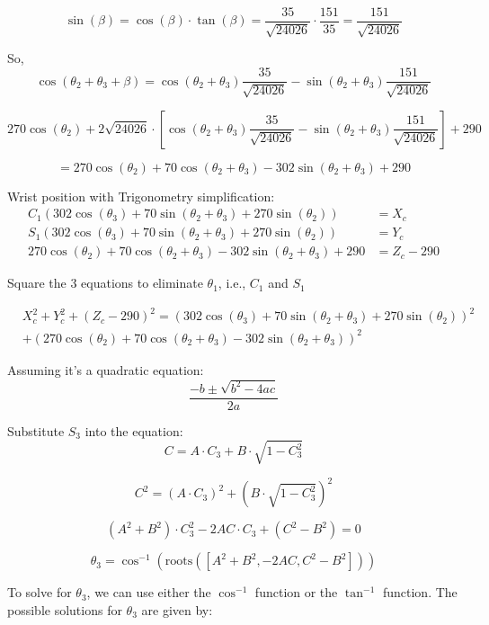 \[
  \sin (\beta) = \cos (\beta) \cdot \tan (\beta) = \frac{35}{\sqrt{24026}} \cdot \frac{151}{35} = \frac{151}{\sqrt{24026}}
\]

So,
\[
  \cos (\theta_2 + \theta_3 + \beta) = \cos (\theta_2 + \theta_3) \frac{35}{\sqrt{24026}} - \sin (\theta_2 + \theta_3) \frac{151}{\sqrt{24026}}
\]

\[
  270 \cos (\theta_2) + 2 \sqrt{24026} \cdot \left[ \cos (\theta_2 + \theta_3) \frac{35}{\sqrt{24026}} - \sin (\theta_2 + \theta_3) \frac{151}{\sqrt{24026}} \right] + 290
\]

\[
  = 270 \cos (\theta_2) + 70 \cos (\theta_2 + \theta_3) - 302 \sin (\theta_2 + \theta_3) + 290
\]

\noindent Wrist position with Trigonometry simplification:
\[
  \begin{aligned}
    C_1 (302 \cos (\theta_3) + 70 \sin (\theta_2 + \theta_3) + 270 \sin (\theta_2))            & = X_c       \\
    S_1 (302 \cos (\theta_3) + 70 \sin (\theta_2 + \theta_3) + 270 \sin (\theta_2))            & = Y_c       \\
    270 \cos (\theta_2) + 70 \cos (\theta_2 + \theta_3) - 302 \sin (\theta_2 + \theta_3) + 290 & = Z_c - 290
  \end{aligned}
\]



\noindent Square the 3 equations to eliminate \( \theta_1 \), i.e., \( C_1 \) and \( S_1 \)

\begin{align*}
   & X_c^2 + Y_c^2 + (Z_c - 290)^2 = (302 \cos (\theta_3) + 70 \sin (\theta_2 + \theta_3) + 270 \sin (\theta_2))^2 \\
   & + (270 \cos (\theta_2) + 70 \cos (\theta_2 + \theta_3) - 302 \sin (\theta_2 + \theta_3))^2
\end{align*}


Assuming it's a quadratic equation:
\[
  \frac{-b \pm \sqrt{b^2 - 4ac}}{2a}
\]

Substitute \(S_3\) into the equation:
\[
  C = A \cdot C_3 + B \cdot \sqrt{1 - C_3^2}
\]

\[
  C^2 = (A \cdot C_3)^2 + (B \cdot \sqrt{1 - C_3^2})^2
\]

\[
  (A^2 + B^2) \cdot C_3^2 - 2AC \cdot C_3 + (C^2 - B^2) = 0
\]

\[
  \theta_3 = \cos^{-1} \left( \text{roots} \left( [A^2 + B^2, -2AC, C^2 - B^2] \right) \right)
\]

\noindent To solve for \(\theta_3\), we can use either the \(\cos^{-1}\) function or the \(\tan^{-1}\) function. The possible solutions for \(\theta_3\) are given by:

